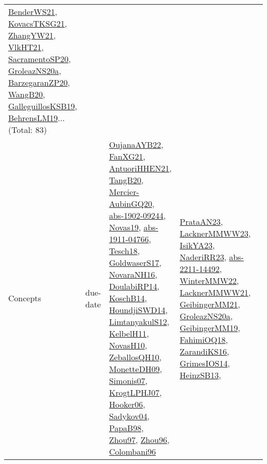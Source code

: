 {\begin{longtable}{lp{3cm}>{\raggedright}p{6cm}>{\raggedright}p{6cm}p{8cm}}
\href{papers/BenderWS21.pdf}{BenderWS21}\cite{BenderWS21}, \href{papers/KovacsTKSG21.pdf}{KovacsTKSG21}\cite{KovacsTKSG21}, \href{articles/ZhangYW21.pdf}{ZhangYW21}\cite{ZhangYW21}, \href{articles/VlkHT21.pdf}{VlkHT21}\cite{VlkHT21}, \href{articles/SacramentoSP20.pdf}{SacramentoSP20}\cite{SacramentoSP20}, \href{papers/GroleazNS20a.pdf}{GroleazNS20a}\cite{GroleazNS20a}, \href{papers/BarzegaranZP20.pdf}{BarzegaranZP20}\cite{BarzegaranZP20}, \href{papers/WangB20.pdf}{WangB20}\cite{WangB20}, \href{papers/GalleguillosKSB19.pdf}{GalleguillosKSB19}\cite{GalleguillosKSB19}, \href{papers/BehrensLM19.pdf}{BehrensLM19}\cite{BehrensLM19}... (Total: 83)\\
Concepts & due-date & \href{papers/OujanaAYB22.pdf}{OujanaAYB22}\cite{OujanaAYB22}, \href{articles/FanXG21.pdf}{FanXG21}\cite{FanXG21}, \href{papers/AntuoriHHEN21.pdf}{AntuoriHHEN21}\cite{AntuoriHHEN21}, \href{papers/TangB20.pdf}{TangB20}\cite{TangB20}, \href{papers/Mercier-AubinGQ20.pdf}{Mercier-AubinGQ20}\cite{Mercier-AubinGQ20}, \href{articles/abs-1902-09244.pdf}{abs-1902-09244}\cite{abs-1902-09244}, \href{articles/Novas19.pdf}{Novas19}\cite{Novas19}, \href{articles/abs-1911-04766.pdf}{abs-1911-04766}\cite{abs-1911-04766}, \href{papers/Tesch18.pdf}{Tesch18}\cite{Tesch18}, \href{papers/GoldwaserS17.pdf}{GoldwaserS17}\cite{GoldwaserS17}, \href{articles/NovaraNH16.pdf}{NovaraNH16}\cite{NovaraNH16}, \href{papers/DoulabiRP14.pdf}{DoulabiRP14}\cite{DoulabiRP14}, \href{papers/KoschB14.pdf}{KoschB14}\cite{KoschB14}, \href{papers/HoundjiSWD14.pdf}{HoundjiSWD14}\cite{HoundjiSWD14}, \href{articles/LimtanyakulS12.pdf}{LimtanyakulS12}\cite{LimtanyakulS12}, \href{articles/KelbelH11.pdf}{KelbelH11}\cite{KelbelH11}, \href{articles/NovasH10.pdf}{NovasH10}\cite{NovasH10}, \href{articles/ZeballosQH10.pdf}{ZeballosQH10}\cite{ZeballosQH10}, \href{papers/MonetteDH09.pdf}{MonetteDH09}\cite{MonetteDH09}, \href{articles/Simonis07.pdf}{Simonis07}\cite{Simonis07}, \href{papers/KrogtLPHJ07.pdf}{KrogtLPHJ07}\cite{KrogtLPHJ07}, \href{articles/Hooker06.pdf}{Hooker06}\cite{Hooker06}, \href{papers/Sadykov04.pdf}{Sadykov04}\cite{Sadykov04}, \href{articles/PapaB98.pdf}{PapaB98}\cite{PapaB98}, \href{articles/Zhou97.pdf}{Zhou97}\cite{Zhou97}, \href{papers/Zhou96.pdf}{Zhou96}\cite{Zhou96}, \href{papers/Colombani96.pdf}{Colombani96}\cite{Colombani96} & \href{articles/PrataAN23.pdf}{PrataAN23}\cite{PrataAN23}, \href{articles/LacknerMMWW23.pdf}{LacknerMMWW23}\cite{LacknerMMWW23}, \href{articles/IsikYA23.pdf}{IsikYA23}\cite{IsikYA23}, \href{articles/NaderiRR23.pdf}{NaderiRR23}\cite{NaderiRR23}, \href{articles/abs-2211-14492.pdf}{abs-2211-14492}\cite{abs-2211-14492}, \href{papers/WinterMMW22.pdf}{WinterMMW22}\cite{WinterMMW22}, \href{papers/LacknerMMWW21.pdf}{LacknerMMWW21}\cite{LacknerMMWW21}, \href{papers/GeibingerMM21.pdf}{GeibingerMM21}\cite{GeibingerMM21}, \href{papers/GroleazNS20a.pdf}{GroleazNS20a}\cite{GroleazNS20a}, \href{papers/GeibingerMM19.pdf}{GeibingerMM19}\cite{GeibingerMM19}, \href{articles/FahimiOQ18.pdf}{FahimiOQ18}\cite{FahimiOQ18}, \href{articles/ZarandiKS16.pdf}{ZarandiKS16}\cite{ZarandiKS16}, \href{articles/GrimesIOS14.pdf}{GrimesIOS14}\cite{GrimesIOS14}, \href{articles/HeinzSB13.pdf}{HeinzSB13}\cite{HeinzSB13}, 
\end{longtable}}
